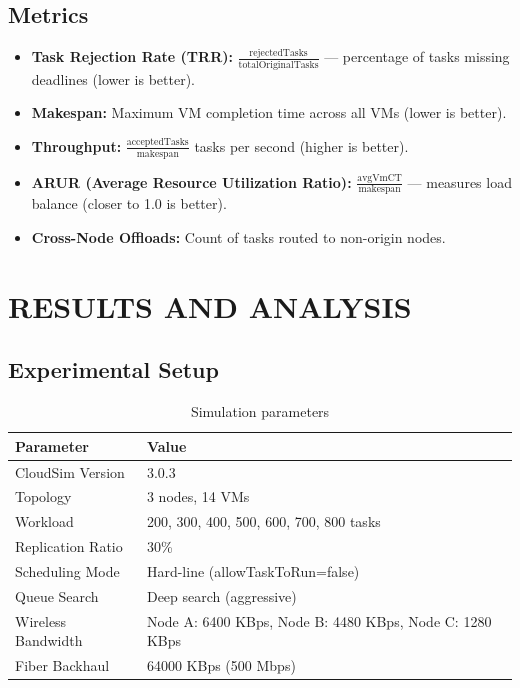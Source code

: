 \documentclass[12pt]{report}
\begin{document}
\section{Metrics}

\begin{itemize}
    \item \textbf{Task Rejection Rate (TRR):} $\frac{\text{rejectedTasks}}{\text{totalOriginalTasks}}$ — percentage of tasks missing deadlines (lower is better).
    
    \item \textbf{Makespan:} Maximum VM completion time across all VMs (lower is better).
    
    \item \textbf{Throughput:} $\frac{\text{acceptedTasks}}{\text{makespan}}$ tasks per second (higher is better).
    
    \item \textbf{ARUR (Average Resource Utilization Ratio):} $\frac{\text{avgVmCT}}{\text{makespan}}$ — measures load balance (closer to 1.0 is better).
    
    \item \textbf{Cross-Node Offloads:} Count of tasks routed to non-origin nodes.
\end{itemize}


\chapter{RESULTS AND ANALYSIS}
\label{ch:results}

\section{Experimental Setup}

\begin{table}[H]
\centering
\caption{Simulation parameters}
\label{tab:sim_params}
\begin{tabular}{ll}
\toprule
\textbf{Parameter} & \textbf{Value} \\
\midrule
CloudSim Version & 3.0.3 \\
Topology & 3 nodes, 14 VMs \\
Workload & 200, 300, 400, 500, 600, 700, 800 tasks \\
Replication Ratio & 30\% \\
Scheduling Mode & Hard-line (allowTaskToRun=false) \\
Queue Search & Deep search (aggressive) \\
Wireless Bandwidth & Node A: 6400 KBps, Node B: 4480 KBps, Node C: 1280 KBps \\
Fiber Backhaul & 64000 KBps (500 Mbps) \\
\bottomrule
\end{tabular}
\end{table}
\end{document}
